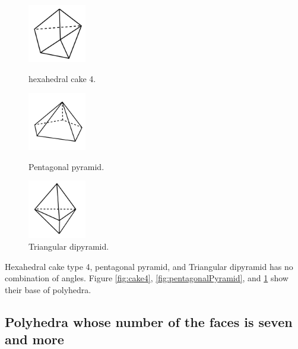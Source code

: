 \documentclass[suppldata, dvipdfmx]{interact}
\theoremstyle{plain}%
\theoremstyle{definition}
\theoremstyle{remark}
\theoremstyle{problemstyle}
\begin{document}
\begin{figure}[H]
  \begin{minipage}[t]{0.3\textwidth}
   \centering 
   \includegraphics[width=1in, height=1in,
   keepaspectratio]{./img/HexahedraWithSphericalFaces/otherPolyhedra/hexahedralCake4.jpg}
   \caption{hexahedral cake 4.}
   \label{fig:cake4}
  \end{minipage}
 \hspace*{\fill}
  \begin{minipage}[t]{0.3\textwidth}
   \centering
   \includegraphics[width=1in, height=1in,
   keepaspectratio]{./img/HexahedraWithSphericalFaces/otherPolyhedra/pentagonalPyramid.jpg}
   \caption{Pentagonal pyramid.}
   \label{fig:pentagonalPyramid}
  \end{minipage}
  \hspace*{\fill}
  \begin{minipage}[t]{0.3\textwidth}
   \centering
   \includegraphics[width=1in, height=1in,
   keepaspectratio]{./img/HexahedraWithSphericalFaces/otherPolyhedra/triangularDipyramid.jpg} 
   \caption{Triangular dipyramid.}
   \label{fig:triangularDipyramid}
  \end{minipage}
  \hspace*{\fill}
\end{figure}

Hexahedral cake type 4, pentagonal pyramid, and Triangular dipyramid has
no combination of angles.
Figure \ref{fig:cake4}, \ref{fig:pentagonalPyramid}, and
\ref{fig:triangularDipyramid} show their base of polyhedra.

\subsection{Polyhedra whose number of the faces is seven and more}
\end{document}
